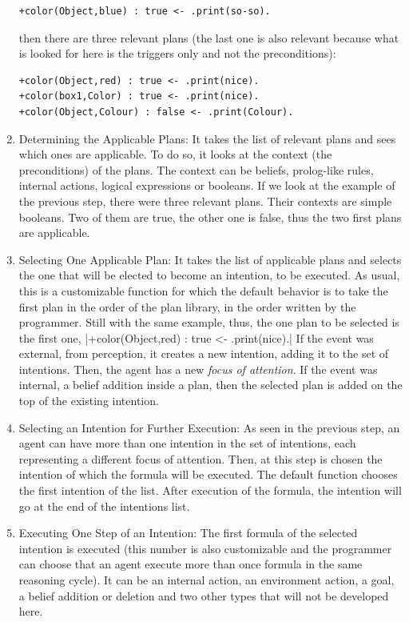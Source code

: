 \documentclass[a4paper,11pt,twoside]{StyleThese}
\begin{document}
\begin{enumerate}
\begin{lstlisting}[style=inline]
+color(Object,blue) : true <- .print(so-so).
\end{lstlisting}
	then there are three relevant plans (the last one is also relevant because what is looked for here is the triggers only and not the preconditions):
\begin{lstlisting}[style=inline]
+color(Object,red) : true <- .print(nice).
+color(box1,Color) : true <- .print(nice).
+color(Object,Colour) : false <- .print(Colour).
\end{lstlisting}
	\item Determining the Applicable Plans: It takes the list of relevant plans and sees which ones are applicable. To do so, it looks at the context (the preconditions) of the plans. The context can be beliefs, prolog-like rules, internal actions, logical expressions or booleans. If we look at the example of the previous step, there were three relevant plans. Their contexts are simple booleans. Two of them are true, the other one is false, thus the two first plans are applicable.
	\item Selecting One Applicable Plan: It takes the list of applicable plans and selects the one that will be elected to become an intention, \ie to be executed. As usual, this is a customizable function for which the default behavior is to take the first plan in the order of the plan library, \ie in the order written by the programmer. Still with the same example, thus, the one plan to be selected is the first one, |+color(Object,red) : true <- .print(nice).| If the event was external, \ie from perception, it creates a new intention, adding it to the set of intentions. Then, the agent has a new \textit{focus of attention}. If the event was internal, \eg a belief addition inside a plan, then the selected plan is added on the top of the existing intention. 
	\item Selecting an Intention for Further Execution: As seen in the previous step, an agent can have more than one intention in the set of intentions, each representing a different focus of attention. Then, at this step is chosen the intention of which the formula will be executed. The default function chooses the first intention of the list. After execution of the formula, the intention will go at the end of the intentions list.
	\item Executing One Step of an Intention: The first formula of the selected intention is executed (this number is also customizable and the programmer can choose that an agent execute more than once formula in the same reasoning cycle). It can be an internal action, an environment action, a goal, a belief addition or deletion and two other types that will not be developed here. 
\end{enumerate}
\end{document}
